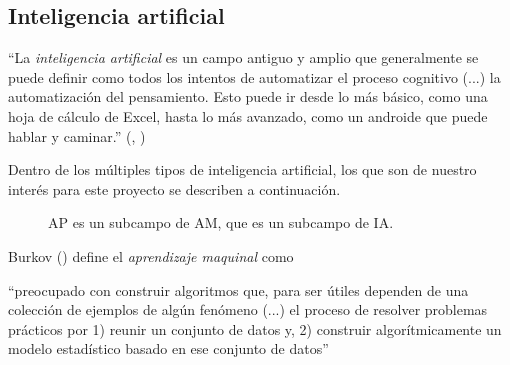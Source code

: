 \subsection {Inteligencia artificial}\label{subsec:intela}
\begin{displayquote}
``La \emph{inteligencia artificial} es un campo antiguo y amplio que generalmente se puede definir como todos los intentos de automatizar el proceso cognitivo (...) la automatización del pensamiento. Esto puede ir desde lo más básico, como una hoja de cálculo de Excel, hasta lo más avanzado, como un androide que puede hablar y caminar.'' (\citeauthor{cho18}, \citeyear{cho18})
\end{displayquote}

Dentro de los múltiples tipos de inteligencia artificial, los que son de nuestro interés para este proyecto se describen a continuación.

\begin{wrapfigure}[10]{r}[0cm]{2.66cm}
	\caption[Inteligencia artificial]{AP es un subcampo de AM, que es un subcampo de IA.}\label{FIG:IA}
\end{wrapfigure}
Burkov (\citeyear{burk19}) define el \emph{aprendizaje maquinal} como
\begin{displayquote}
``preocupado con construir algoritmos que, para ser útiles dependen de una colección de ejemplos de algún fenómeno (...) el proceso de resolver problemas prácticos por 1) reunir un conjunto de datos y, 2) construir algorítmicamente un modelo estadístico basado en ese conjunto de datos''
\end{displayquote}

